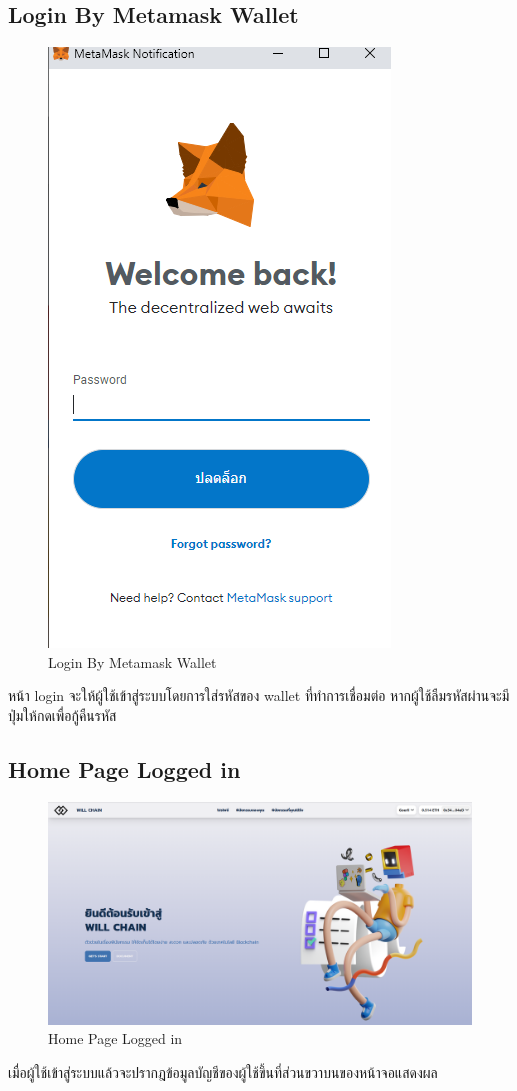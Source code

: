 \documentclass[12pt,oneside,openright,a4paper]{cpe-thai-project}
\begin{document}
\subsection{Login By Metamask Wallet}
	\begin{figure}[!thb]
			\centering
			\includegraphics[scale=0.2]{metamaskLogin4}
			\caption{Login By Metamask Wallet}
		\end{figure}
		\FloatBarrier
\tab หน้า login จะให้ผู้ใช้เข้าสู่ระบบโดยการใส่รหัสของ wallet ที่ทำการเชื่อมต่อ หากผู้ใช้ลืมรหัสผ่านจะมีปุ่มให้กดเพื่อกู้คืนรหัส
\subsection{Home Page Logged in}
	\begin{figure}[!thb]
			\centering
			\includegraphics[scale=0.2]{homePageAfter4}
			\caption{Home Page Logged in }
		\end{figure}
		\FloatBarrier
\tab เมื่อผู้ใช้เข้าสู่ระบบแล้วจะปรากฎข้อมูลบัญชีของผู้ใช้ขึ้นที่ส่วนขวาบนของหน้าจอแสดงผล
\end{document}
